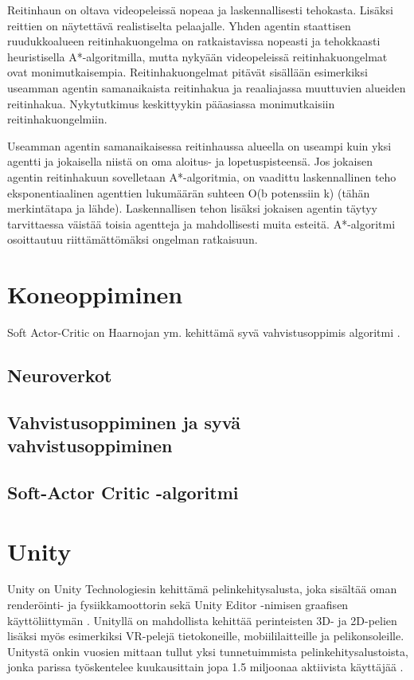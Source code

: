\documentclass[utf8]{gradu3}
\begin{document}
Reitinhaun on oltava videopeleissä nopeaa ja laskennallisesti tehokasta. Lisäksi reittien on näytettävä realistiselta pelaajalle. Yhden agentin staattisen ruudukkoalueen reitinhakuongelma on ratkaistavissa nopeasti ja tehokkaasti heuristisella A*-algoritmilla, mutta nykyään videopeleissä reitinhakuongelmat ovat monimutkaisempia. Reitinhakuongelmat pitävät sisällään esimerkiksi useamman agentin samanaikaista reitinhakua ja reaaliajassa muuttuvien alueiden reitinhakua. Nykytutkimus keskittyykin pääasiassa monimutkaisiin reitinhakuongelmiin.

Useamman agentin samanaikaisessa reitinhaussa alueella on useampi kuin yksi agentti ja jokaisella niistä on oma aloitus- ja lopetuspisteensä. Jos jokaisen agentin reitinhakuun sovelletaan A*-algoritmia, on vaadittu laskennallinen teho eksponentiaalinen agenttien lukumäärän suhteen O(b potenssiin k) (tähän merkintätapa ja lähde). Laskennallisen tehon lisäksi jokaisen agentin täytyy tarvittaessa väistää toisia agentteja ja mahdollisesti muita esteitä. A*-algoritmi osoittautuu riittämättömäksi ongelman ratkaisuun.

\chapter{Koneoppiminen}

Soft Actor-Critic on Haarnojan ym. kehittämä syvä vahvistusoppimis algoritmi \parencite{haarnoja2018soft}. 

\section{Neuroverkot}

\section{Vahvistusoppiminen ja syvä vahvistusoppiminen}

\section{Soft-Actor Critic -algoritmi}

\chapter{Unity}

Unity on Unity Technologiesin kehittämä pelinkehitysalusta, joka sisältää oman renderöinti- ja fysiikkamoottorin sekä Unity Editor -nimisen graafisen käyttöliittymän \parencite{juliani2018unity}. Unityllä on mahdollista kehittää perinteisten 3D- ja 2D-pelien lisäksi myös esimerkiksi VR-pelejä tietokoneille, mobiililaitteille ja pelikonsoleille. Unitystä onkin vuosien mittaan tullut yksi tunnetuimmista pelinkehitysalustoista, jonka parissa työskentelee kuukausittain jopa 1.5 miljoonaa aktiivista käyttäjää \parencite{unityweb}.
\end{document}
